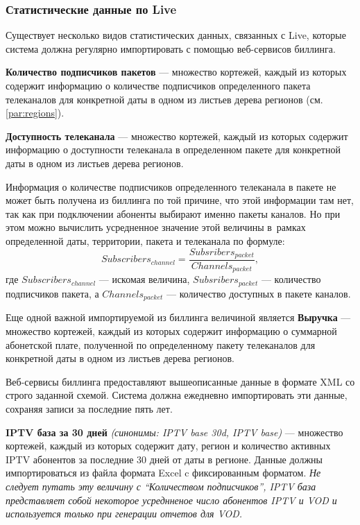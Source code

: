 \subsubsection{Статистические данные по Live}
\label{stat:live}
Существует несколько видов статистических данных, связанных с Live, которые система должна регулярно импортировать
с помощью веб-сервисов биллинга.

\textbf{Количество подписчиков пакетов} --- множество кортежей, каждый из которых содержит информацию о количестве подписчиков
определенного пакета телеканалов для конкретной даты в одном из листьев дерева регионов (см. \ref{par:regions}).

\textbf{Доступность телеканала} --- множество кортежей, каждый из которых содержит информацию о доступности телеканала в
определенном пакете для конкретной даты в одном из листьев дерева регионов.

\label{stat:subscribers}
Информация о количестве подписчиков определенного телеканала в пакете не может быть получена из биллинга по той причине, что этой информации там нет, 
так как при подключении абоненты выбирают именно пакеты каналов. Но при этом можно вычислить усредненное значение этой величины 
в~рамках определенной даты, территории, пакета и телеканала по формуле:
$$Subscribers_{channel} = \frac{Subsribers_{packet}} {Channels_{packet}}, $$
где $Subscribers_{channel}$ --- искомая величина,  $Subsribers_{packet}$ --- количество подписчиков пакета, 
а $Channels_{packet}$ --- количество доступных в пакете каналов.

Еще одной важной импортируемой из биллинга величиной является \textbf{Выручка} --- множество кортежей, каждый из которых содержит информацию о
суммарной абонетской плате, полученной по определенному пакету телеканалов для конкретной даты в одном из листьев дерева регионов.
 
Веб-сервисы биллинга предоставляют вышеописанные данные в формате XML со строго заданной схемой. Система должна ежедневно импортировать эти данные,
сохраняя записи за последние пять лет.

\textbf{IPTV база за 30 дней} \textit{(синонимы: IPTV base 30d, IPTV base)} --- множество кортежей, каждый из которых содержит дату,
регион и количество активных IPTV абонентов за последние 30 дней от даты в регионе. 
Данные должны импортироваться из файла формата Excel c фиксированным форматом.
\textit{Не следует путать эту величину с ``Количеством подписчиков'',  IPTV база представляет собой некоторое усреднненое число 
абонентов IPTV и VOD и используется только при генерации отчетов для VOD.}

